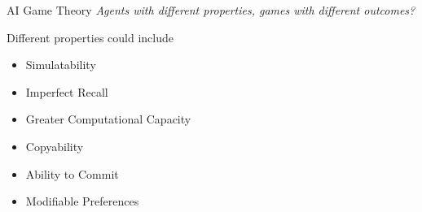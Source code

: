 \documentclass[aspectratio=169, handout]{beamer}
\begin{document}
\begin{frame}{AI Game Theory}
\centering
\textit{Agents with different properties, games with different outcomes?}
\pause

\vspace{1em} %

\raggedright
Different properties could include \pause
\begin{itemize}
    \item Simulatability  \parencite{cooper_characterising_2024, kovarik_game_2024}\pause
    \item Imperfect Recall  \parencite{chen_imperfect_2024}\pause
    \item Greater Computational Capacity \pause
    \item Copyability \pause
    \item Ability to Commit \pause
    \item Modifiable Preferences
\end{itemize}
\end{frame}
\end{document}
